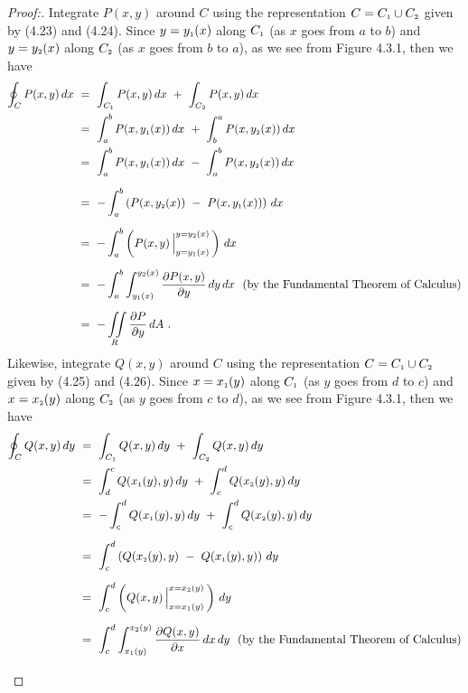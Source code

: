 \begin{proofbar}
\begin{proof}[Proof:]
 \par\noindent Integrate $P(x,y)$ around $C$ using the representation $C = C_{\scriptscriptstyle 1} \cup C_{\scriptscriptstyle 2}$ given by (4.23)
 and (4.24).
\newpage
\noindent Since $y = y_{\scriptscriptstyle 1}(x)$ along $C_{\scriptscriptstyle 1}$ (as $x$ goes from $a$ to $b$) and $y = y_{\scriptscriptstyle 2}(x)$ along
 $C_{\scriptscriptstyle 2}$ (as $x$ goes from $b$ to $a$), as we see from Figure 4.3.1, then we have
 \begin{align*}
  \oint_C P(x,y)\,dx ~&=~ \int_{C_{\scriptscriptstyle 1}} P(x,y)\,dx ~+~ \int_{C_{\scriptscriptstyle 2}} P(x,y)\,dx\\
   &=~ \int_a^b P(x,y_{\scriptscriptstyle 1}(x))\,dx ~+~ \int_b^a P(x,y_{\scriptscriptstyle 2}(x))\,dx\\
   &=~ \int_a^b P(x,y_{\scriptscriptstyle 1}(x))\,dx ~-~ \int_a^b P(x,y_{\scriptscriptstyle 2}(x))\,dx\\[6pt]
   &=~ -\int_a^b \left( P(x,y_{\scriptscriptstyle 2}(x)) ~-~ P(x,y_{\scriptscriptstyle 1}(x)) \right)\,dx\\[6pt]
   &=~ -\int_a^b \left( P(x,y) \,\Big|_{y = y_{\scriptscriptstyle 1}(x)}^{y = y_{\scriptscriptstyle 2}(x)} \,\right)\,dx\\[6pt]
   &=~ -\int_a^b \int_{y_{\scriptscriptstyle 1}(x)}^{y_{\scriptscriptstyle 2}(x)} \frac{\partial P(x,y)}{\partial y}\,dy\,dx ~~\text{(by the
    Fundamental Theorem of Calculus)}\\[6pt]
   &=~ -\iint\limits_{R} \frac{\partial P}{\partial y}\,dA ~.
 \end{align*}
 Likewise, integrate $Q(x,y)$ around $C$ using the representation $C = C_{\scriptscriptstyle 1} \cup C_{\scriptscriptstyle 2}$ given by (4.25) and
 (4.26). Since $x = x_{\scriptscriptstyle 1}(y)$ along $C_{\scriptscriptstyle 1}$ (as $y$ goes from $d$ to $c$) and $x = x_{\scriptscriptstyle 2}(y)$ along
 $C_{\scriptscriptstyle 2}$ (as $y$ goes from $c$ to $d$), as we see from Figure 4.3.1, then we have
 \begin{align*}
  \oint_C Q(x,y)\,dy ~&=~ \int_{\ssub{C}{1}} Q(x,y)\,dy ~+~ \int_{\ssub{C}{2}} Q(x,y)\,dy\\
   &=~ \int_d^c Q(\ssub{x}{1}(y),y)\,dy ~+~ \int_c^d Q(\ssub{x}{2}(y),y)\,dy\\
   &=~ -\int_c^d Q(\ssub{x}{1}(y),y)\,dy ~+~ \int_c^d Q(\ssub{x}{2}(y),y)\,dy\\[6pt]
   &=~ \int_c^d \left( Q(\ssub{x}{2}(y),y) ~-~ Q(\ssub{x}{1}(y),y) \right)\,dy\\[6pt]
   &=~ \int_c^d \left( Q(x,y) \,\Big|_{x = \ssub{x}{1}(y)}^{x = \ssub{x}{2}(y)} \,\right)\,dy\\[6pt]
   &=~ \int_c^d \int_{\ssub{x}{1}(y)}^{\ssub{x}{2}(y)} \frac{\partial Q(x,y)}{\partial x}\,dx\,dy ~~\text{(by the
    Fundamental Theorem of Calculus)}\\[6pt]

\end{align*}
\end{proof}
\end{proofbar}
